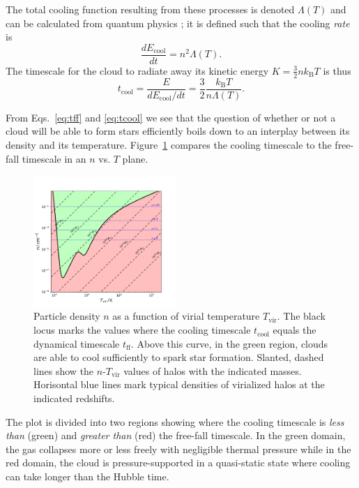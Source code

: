 \documentclass[useAMS,usenatbib,bibyear]{aa}
\begin{document}
The total cooling function resulting from these processes is denoted $\Lambda(T)$ and can be calculated from quantum physics \citep[e.g.][]{Sutherland1993}; it is defined such that the cooling \emph{rate} is
\begin{equation}
    \label{eq:Lambda}
    \frac{dE_\mathrm{cool}}{dt} = n^2 \Lambda(T).
\end{equation}
The timescale for the cloud to radiate away its kinetic energy $K = \frac{3}{2}nk_\mathrm{B}T$ is thus
\begin{equation}
    \label{eq:tcool}
    t_\mathrm{cool} = \frac{E}{dE_\mathrm{cool}/dt}
                    = \frac{3}{2}\frac{k_\mathrm{B}T}{n\Lambda(T)}.
\end{equation}

From Eqs.~\ref{eq:tff} and \ref{eq:tcool} we see that the question of whether or not a cloud will be able to form stars efficiently boils down to an interplay between its density and its temperature.
Figure~\ref{fig:cooling} compares the cooling timescale to the free-fall timescale in an $n$ vs. $T$ plane. 
\begin{figure}[!t]
    \centering
    \includegraphics [width=0.48\textwidth] {cooling.pdf}
    \caption{Particle density $n$ as a function of virial temperature $T_\mathrm{vir}$. The black locus marks the values where the cooling timescale $t_\mathrm{cool}$ equals the dynamical timescale $t_\mathrm{ff}$. Above this curve, in the green region, clouds are able to cool sufficiently to spark star formation. Slanted, dashed lines show the $n\text{-}T_\mathrm{vir}$ values of halos with the indicated masses. Horisontal blue lines mark typical densities of virialized halos at the indicated redshifts.}
    \label{fig:cooling}
\end{figure}
The plot is divided into two regions showing where the cooling timescale is \emph{less than} (green) and \emph{greater than} (red) the free-fall timescale.
In the green domain, the gas collapses more or less freely with negligible thermal pressure while in the red domain, the cloud is pressure-supported in a quasi-static state where cooling can take longer than the Hubble time.
\end{document}
